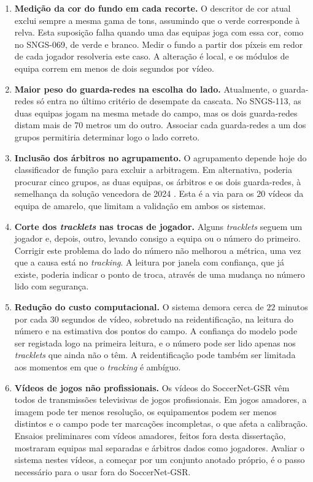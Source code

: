 \begin{enumerate}
    \item \textbf{Medição da cor do fundo em cada recorte.} O descritor de cor atual exclui sempre a mesma gama de tons, assumindo que o verde corresponde à relva. Esta suposição falha quando uma das equipas joga com essa cor, como no SNGS-069, de verde e branco. Medir o fundo a partir dos píxeis em redor de cada jogador resolveria este caso. A alteração é local, e os módulos de equipa correm em menos de dois segundos por vídeo.

    \item \textbf{Maior peso do guarda-redes na escolha do lado.} Atualmente, o guarda-redes só entra no último critério de desempate da cascata. No SNGS-113, as duas equipas jogam na mesma metade do campo, mas os dois guarda-redes distam mais de $70$ metros um do outro. Associar cada guarda-redes a um dos grupos permitiria determinar logo o lado correto.

    \item \textbf{Inclusão dos árbitros no agrupamento.} O agrupamento depende hoje do classificador de função para excluir a arbitragem. Em alternativa, poderia procurar cinco grupos, as duas equipas, os árbitros e os dois guarda-redes, à semelhança da solução vencedora de 2024 \citep{golovkin2025minimap}. Esta é a via para os $20$ vídeos da equipa de amarelo, que limitam a validação em ambos os sistemas.

    \item \textbf{Corte dos \emph{tracklets} nas trocas de jogador.} Alguns \emph{tracklets} seguem um jogador e, depois, outro, levando consigo a equipa ou o número do primeiro. Corrigir este problema do lado do número não melhorou a métrica, uma vez que a causa está no \emph{tracking}. A leitura por janela com confiança, que já existe, poderia indicar o ponto de troca, através de uma mudança no número lido com segurança.

    \item \textbf{Redução do custo computacional.} O sistema demora cerca de $22$ minutos por cada $30$ segundos de vídeo, sobretudo na reidentificação, na leitura do número e na estimativa dos pontos do campo. A confiança do modelo pode ser registada logo na primeira leitura, e o número pode ser lido apenas nos \emph{tracklets} que ainda não o têm. A reidentificação pode também ser limitada aos momentos em que o \emph{tracking} é ambíguo.

    \item \textbf{Vídeos de jogos não profissionais.} Os vídeos do SoccerNet-GSR vêm todos de transmissões televisivas de jogos profissionais. Em jogos amadores, a imagem pode ter menos resolução, os equipamentos podem ser menos distintos e o campo pode ter marcações incompletas, o que afeta a calibração. Ensaios preliminares com vídeos amadores, feitos fora desta dissertação, mostraram equipas mal separadas e árbitros dados como jogadores. Avaliar o sistema nestes vídeos, a começar por um conjunto anotado próprio, é o passo necessário para o usar fora do SoccerNet-GSR.
\end{enumerate}

